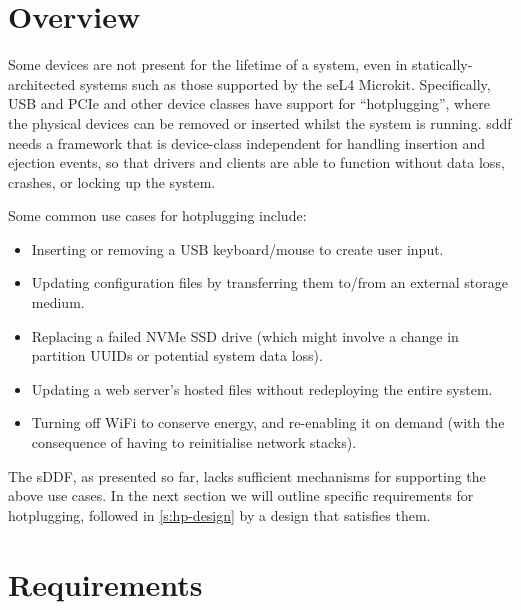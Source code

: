 \documentclass[a4paper,12pt]{report}
\begin{document}
\section{Overview}

Some devices are not present for the lifetime of a system,
even in statically-architected systems such as those supported by the seL4
Microkit. Specifically, USB and PCIe and other device classes have support for ``hotplugging'',
where the physical devices can be removed or inserted whilst the system is running.
\gls{sddf} needs a framework that is device-class independent for handling
insertion and ejection events, so that drivers and clients are able to function
without data loss, crashes, or locking up the system.

Some common use cases for hotplugging include:

\begin{itemize}
  \item Inserting or removing a USB keyboard/mouse to create user input.

  \item Updating configuration files by transferring them to/from an external storage medium.

  \item Replacing a failed NVMe SSD drive (which might involve a change in partition UUIDs
        or potential system data loss).

  \item Updating a web server's hosted files without redeploying the entire system.

  \item Turning off WiFi to conserve energy, and re-enabling it on
    demand (with the consequence of having to reinitialise network stacks).
\end{itemize}

The sDDF, as presented so far, lacks sufficient mechanisms for
supporting the above use cases. In the next section we will outline
specific requirements for hotplugging, followed in
\autoref{s:hp-design} by a design that satisfies them.

\section{Requirements}
\end{document}
